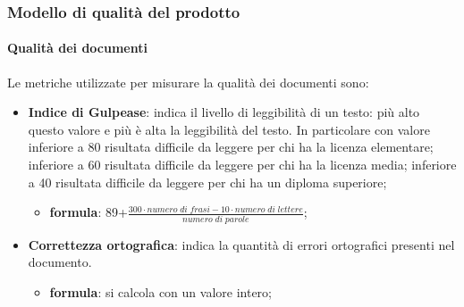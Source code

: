 \subsubsection{Modello di qualità del prodotto}
	\paragraph{Qualità dei documenti}
	Le metriche utilizzate per misurare la qualità dei documenti sono:
	\begin{itemize}
		\item \textbf{Indice di Gulpease}: indica il livello di leggibilità di un testo: più alto questo valore e più è alta la leggibilità del testo. In particolare con valore inferiore a 80 risultata difficile da leggere per chi ha la licenza elementare; inferiore a 60 risultata difficile da leggere per chi ha la licenza media; inferiore a 40 risultata difficile da leggere per chi ha un diploma superiore;
		\begin{itemize}
			\item[] \textbf{formula}: 89+$\frac{300\cdot numero \; di \; frasi-10\cdot numero \; di \; lettere}{numero \; di \; parole}$;
		\end{itemize}                	
		\item \textbf{Correttezza ortografica}: indica la quantità di errori ortografici presenti nel documento.
		\begin{itemize}
			\item[] \textbf{formula}: si calcola con un valore intero;
		\end{itemize}
	\end{itemize}
